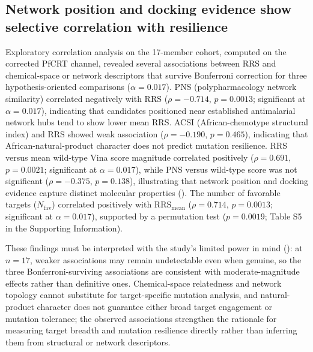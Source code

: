 \documentclass[11pt,a4paper]{article}
\begin{document}
	\subsection{Network position and docking evidence show selective correlation with resilience}\label{sec:results_descriptors}
	Exploratory correlation analysis on the 17-member cohort, computed on the corrected PfCRT channel, revealed several associations between RRS and chemical-space or network descriptors that survive Bonferroni correction for three hypothesis-oriented comparisons ($\alpha=\num{0.017}$). PNS (polypharmacology network similarity) correlated negatively with RRS ($\rho=-\num{0.714}$, $p=\num{0.0013}$; significant at $\alpha=\num{0.017}$), indicating that candidates positioned near established antimalarial network hubs tend to show lower mean RRS. ACSI (African-chemotype structural index) and RRS showed weak association ($\rho=-\num{0.190}$, $p=\num{0.465}$), indicating that African-natural-product character does not predict mutation resilience. RRS versus mean wild-type Vina score magnitude correlated positively ($\rho=\num{+0.691}$, $p=\num{0.0021}$; significant at $\alpha=\num{0.017}$), while PNS versus wild-type score was not significant ($\rho=-\num{0.375}$, $p=\num{0.138}$), illustrating that network position and docking evidence capture distinct molecular properties (). The number of favorable targets ($N_{\mathrm{fav}}$) correlated positively with RRS$_{\mathrm{mean}}$ ($\rho=\num{0.714}$, $p=\num{0.0013}$; significant at $\alpha=\num{0.017}$), supported by a permutation test ($p=\num{0.0019}$; Table S5 in the Supporting Information).
	
	These findings must be interpreted with the study's limited power in mind (): at $n=\num{17}$, weaker associations may remain undetectable even when genuine, so the three Bonferroni-surviving associations are consistent with moderate-magnitude effects rather than definitive ones. Chemical-space relatedness and network topology cannot substitute for target-specific mutation analysis, and natural-product character does not guarantee either broad target engagement or mutation tolerance; the observed associations strengthen the rationale for measuring target breadth and mutation resilience directly rather than inferring them from structural or network descriptors.
	
\end{document}
